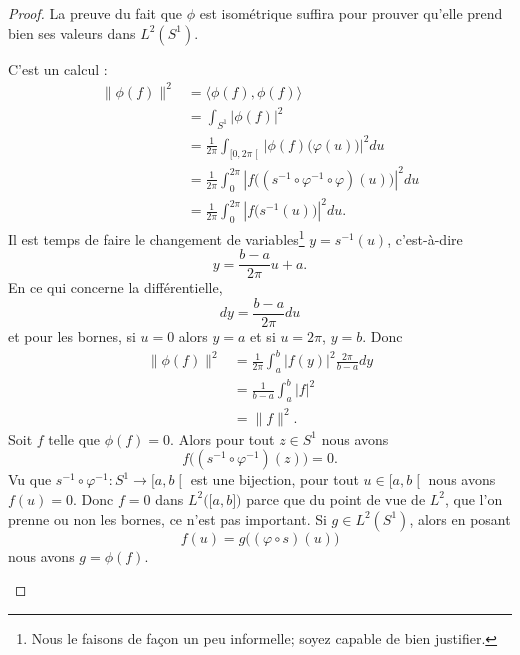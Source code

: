 \begin{proof}
	La preuve du fait que \( \phi\) est isométrique suffira pour prouver qu'elle prend bien ses valeurs dans \( L^2(S^1)\).
	\begin{subproof}
		\spitem[Isométrique]
		C'est un calcul :
		\begin{subequations}
			\begin{align}
				\| \phi(f) \|^2 & =\langle \phi(f), \phi(f)\rangle                                                                         \\
				                & =\int_{S^1}| \phi(f) |^2                                                                                 \\
				                & =\frac{1}{ 2\pi }\int_{\mathopen\lbrack 0 , 2\pi \mathclose\lbrack}| \phi(f)\big( \varphi(u) \big) |^2du \\
				                & =\frac{1}{ 2\pi }\int_0^{2\pi}| f\big( (s^{-1}\circ\varphi^{-1}\circ\varphi)(u) \big) |^2du              \\
				                & =\frac{1}{ 2\pi }\int_0^{2\pi}| f\big( s^{-1}(u) \big) |^2du.
			\end{align}
		\end{subequations}
		Il est temps de faire le changement de variables\footnote{Nous le faisons de façon un peu informelle; soyez capable de bien justifier.} \( y=s^{-1}(u)\), c'est-à-dire
		\begin{equation}
			y=\frac{ b-a }{ 2\pi }u+a.
		\end{equation}
		En ce qui concerne la différentielle,
		\begin{equation}
			dy=\frac{ b-a }{ 2\pi }du
		\end{equation}
		et pour les bornes, si \( u=0\) alors \( y=a\) et si \( u=2\pi\), \( y=b\). Donc
		\begin{subequations}
			\begin{align}
				\| \phi(f) \|^2 & =\frac{1}{ 2\pi }\int_a^b| f(y) |^2\frac{ 2\pi }{ b-a }dy \\
				                & =\frac{1}{ b-a }\int_a^b| f |^2                           \\
				                & =\| f \|^2.
			\end{align}
		\end{subequations}
		\spitem[Injectif]
		Soit \( f\) telle que \( \phi(f)=0\). Alors pour tout \( z\in S^1\) nous avons
		\begin{equation}
			f\big( (s^{-1}\circ\varphi^{-1})(z) \big)=0.
		\end{equation}
		Vu que \( s^{-1}\circ\varphi^{-1}\colon S^1 \to \mathopen\lbrack a , b \mathclose[\) est une bijection, pour tout \( u\in\mathopen\lbrack a , b \mathclose[\) nous avons \( f(u)=0\). Donc \( f=0\) dans \( L^2\big( \mathopen\lbrack a , b \mathclose] \big)\) parce que du point de vue de \( L^2\), que l'on prenne ou non les bornes, ce n'est pas important.
		\spitem[Surjectif]
		Si \( g\in L^2(S^1)\), alors en posant
		\begin{equation}
			f(u)=g\big( (\varphi\circ s)(u) \big)
		\end{equation}
		nous avons \( g=\phi(f)\).
	\end{subproof}
\end{proof}

